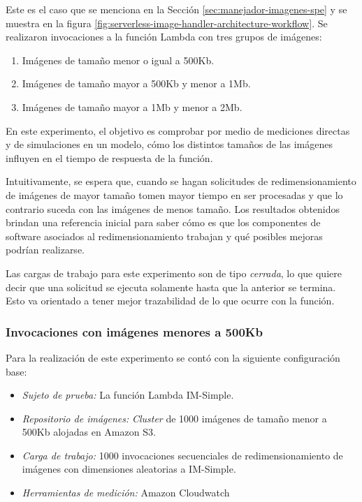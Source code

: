 Este es el caso que se menciona en la Sección \ref{sec:manejador-imagenes-spe} y se muestra en la figura \ref{fig:serverless-image-handler-architecture-workflow}. Se realizaron invocaciones a la función Lambda con tres grupos de imágenes:
\begin{enumerate}
    \item Imágenes de tamaño menor o igual a 500Kb.
    \item Imágenes de tamaño mayor a 500Kb y menor a 1Mb.
    \item Imágenes de tamaño mayor a 1Mb y menor a 2Mb.
\end{enumerate}
En este experimento, el objetivo es comprobar por medio de mediciones directas y de simulaciones en un modelo, cómo los distintos tamaños de las imágenes influyen en el tiempo de respuesta de la función.

Intuitivamente, se espera que, cuando se hagan solicitudes de redimensionamiento de imágenes de mayor tamaño tomen mayor tiempo en ser procesadas y que lo contrario suceda con las imágenes de menos tamaño. Los resultados obtenidos brindan una referencia inicial para saber cómo es que los componentes de software asociados al redimensionamiento trabajan y qué posibles mejoras podrían realizarse.

Las cargas de trabajo para este experimento son de tipo \emph{cerrada}, lo que quiere decir que una solicitud se ejecuta solamente hasta que la anterior se termina. Esto va orientado a tener mejor trazabilidad de lo que ocurre con la función.

\subsubsection{Invocaciones con imágenes menores a 500Kb}
Para la realización de este experimento se contó con la siguiente configuración base:
\begin{itemize}
    \item \emph{Sujeto de prueba:} La función Lambda IM-Simple.
    \item \emph{Repositorio de imágenes:} \emph{Cluster} de 1000 imágenes de tamaño menor a 500Kb alojadas en Amazon S3.     
    \item \emph{Carga de trabajo:} 1000 invocaciones secuenciales de redimensionamiento de imágenes con dimensiones aleatorias a IM-Simple.
    \item \emph{Herramientas de medición:} Amazon Cloudwatch
\end{itemize}

